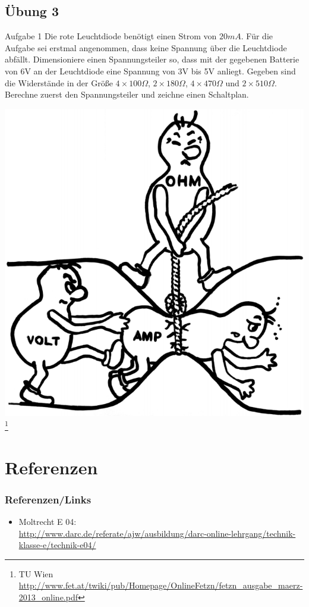 \subsection*{Übung 3}
\begin{frame}
  \begin{alertblock}{Aufgabe 1}
    Die rote Leuchtdiode benötigt einen Strom von $20mA$. Für die Aufgabe sei erstmal angenommen, dass keine Spannung über die Leuchtdiode abfällt. Dimensioniere einen Spannungsteiler so, dass mit der gegebenen Batterie von 6V an der Leuchtdiode eine Spannung von 3V bis 5V anliegt. Gegeben sind die Widerstände in der Größe $4\times100\Omega$, $2\times180\Omega$, $4\times470\Omega$ und $2\times510\Omega$. Berechne zuerst den Spannungsteiler und zeichne einen Schaltplan.
  \end{alertblock}
\end{frame}

\begin{frame}

	\begin{center}
        \includegraphics[width=.8\textwidth]{e04/URI.png}
        \footnote{\tiny TU Wien \url{http://www.fet.at/twiki/pub/Homepage/OnlineFetzn/fetzn_ausgabe_maerz-2013_online.pdf}}
    \end{center}
    
\end{frame}

\section*{Referenzen}

\begin{frame}
    \frametitle{Referenzen/Links}
    
    \footnotesize
    \begin{itemize}
        \item Moltrecht E 04: \\
              \url{http://www.darc.de/referate/ajw/ausbildung/darc-online-lehrgang/technik-klasse-e/technik-e04/}
    \end{itemize}

\end{frame}


